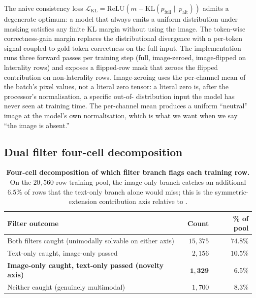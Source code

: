 \documentclass{article}
\begin{document}
The naive consistency loss
$\mathcal{L}_{\mathrm{KL}} = \mathrm{ReLU}(m - \mathrm{KL}(p_{\mathrm{full}} \| p_{\mathrm{alt}}))$
admits a degenerate optimum: a model that always emits a uniform
distribution under masking satisfies any finite KL margin without using
the image. The token-wise correctness-gain margin replaces the
distributional divergence with a per-token signal coupled to gold-token
correctness on the full input. The implementation runs three forward
passes per training step (full, image-zeroed, image-flipped on
laterality rows) and exposes a flipped-row mask that zeroes the flipped
contribution on non-laterality rows. Image-zeroing uses the per-channel
mean of the batch's pixel values, not a literal zero tensor: a literal
zero is, after the processor's normalisation, a specific out-of-
distribution input the model has never seen at training time. The
per-channel mean produces a uniform ``neutral'' image at the model's own
normalisation, which is what we want when we say ``the image is absent.''

\subsection{Dual filter four-cell decomposition}
\label{app:filter}

\begin{table}[t]
\centering
\small
\caption{\textbf{Four-cell decomposition of which filter branch flags
each training row.} On the $20{,}560$-row training pool, the image-only
branch catches an additional $6.5\%$ of rows that the text-only branch
alone would miss; this is the symmetric-extension contribution axis
relative to \citet{li2025sfc}.}
\label{tab:filter-decomp}
\begin{tabular}{lrr}
\toprule
\textbf{Filter outcome} & \textbf{Count} & \textbf{\% of pool}\\
\midrule
Both filters caught (unimodally solvable on either axis) & $15{,}375$ & $74.8\%$\\
Text-only caught, image-only passed                       & $\phantom{0}2{,}156$  & $10.5\%$\\
\textbf{Image-only caught, text-only passed (novelty axis)} & $\phantom{0}\mathbf{1{,}329}$  & $\mathbf{6.5}\%$\\
Neither caught (genuinely multimodal)                     & $\phantom{0}1{,}700$  & $\phantom{0}8.3\%$\\
\bottomrule
\end{tabular}
\end{table}
\end{document}
